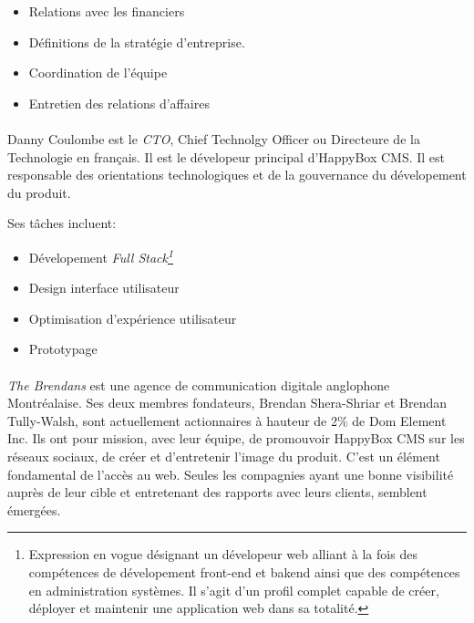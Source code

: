 \documentclass[11pt, a4paper ]{article}
\begin{document}
\begin{spacing}{1.5}
		\begin{itemize}
			\item
				Relations avec les financiers
			\item
				Définitions de la stratégie d'entreprise.
			\item
				Coordination de l'équipe
			\item
				Entretien des relations d'affaires
		\end{itemize}

\paragraph{}
	Danny Coulombe est le \emph{CTO}, Chief Technolgy Officer ou Directeure de la Technologie en français. Il est le dévelopeur principal d'HappyBox CMS. Il est responsable des orientations technologiques et de la gouvernance du dévelopement du produit.

	Ses tâches incluent:

		\begin{itemize}

			\item
				Dévelopement \emph{Full Stack\footnote{Expression en vogue désignant un dévelopeur web alliant à la fois des compétences de dévelopement front-end et bakend ainsi que des compétences en administration systèmes. Il s'agit d'un profil complet capable de créer, déployer et maintenir une application web dans sa totalité.}}
			\item
				Design interface utilisateur
			\item
				Optimisation d'expérience utilisateur
			\item
				Prototypage

		\end{itemize}



\paragraph{} %
	\emph{The Brendans} est une agence de communication digitale anglophone Montréalaise. Ses deux membres fondateurs, Brendan Shera-Shriar et Brendan Tully-Walsh, sont actuellement actionnaires à hauteur de 2\% de Dom Element Inc. Ils ont pour mission, avec leur équipe, de promouvoir HappyBox CMS sur les réseaux sociaux, de créer et d'entretenir l'image du produit.
	C'est un élément fondamental de l'accès au web. Seules les compagnies ayant une bonne visibilité auprès de leur cible et entretenant des rapports avec leurs clients, semblent émergées.


\end{spacing}
\end{document}
